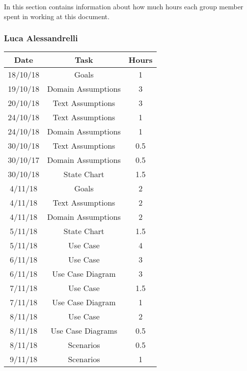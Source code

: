In this section contains information about how much hours each group member spent in working at this document.
\bigbreak

\subsubsection{Luca Alessandrelli}
\begin{table}[h]
\centering
\begin{tabular}{|c|c|c|}
\hline
\rowcolor[HTML]{FE996B} 
Date & Task & Hours 
\\ \hline
\rowcolor[HTML]{FFFC9E} 
18/10/18  & Goals & 1  
\\ \hline
\rowcolor[HTML]{FFFC9E} 
19/10/18 & Domain Assumptions & 3 
\\ \hline
\rowcolor[HTML]{FFFC9E}
20/10/18 & Text Assumptions & 3
\\ \hline
\rowcolor[HTML]{FFFC9E}
24/10/18 & Text Assumptions & 1
\\ \hline
\rowcolor[HTML]{FFFC9E}
24/10/18 & Domain Assumptions & 1
\\ \hline
\rowcolor[HTML]{FFFC9E}
30/10/18 & Text Assumptions & 0.5
\\ \hline
\rowcolor[HTML]{FFFC9E}
30/10/17 & Domain Assumptions & 0.5
\\ \hline
\rowcolor[HTML]{FFFC9E}
30/10/18 & State Chart & 1.5
\\ \hline
\rowcolor[HTML]{FFFC9E}
4/11/18 & Goals & 2
\\ \hline
\rowcolor[HTML]{FFFC9E}
4/11/18 & Text Assumptions & 2
\\ \hline
\rowcolor[HTML]{FFFC9E}
4/11/18 & Domain Assumptions & 2
\\ \hline
\rowcolor[HTML]{FFFC9E}
5/11/18 & State Chart & 1.5
\\ \hline
\rowcolor[HTML]{FFFC9E}
5/11/18 & Use Case & 4
\\ \hline
\rowcolor[HTML]{FFFC9E}
6/11/18 & Use Case & 3
\\ \hline
\rowcolor[HTML]{FFFC9E}
6/11/18 & Use Case Diagram & 3
\\ \hline
\rowcolor[HTML]{FFFC9E}
7/11/18 & Use Case & 1.5
\\ \hline
\rowcolor[HTML]{FFFC9E}
7/11/18 & Use Case Diagram & 1
\\ \hline
\rowcolor[HTML]{FFFC9E}
8/11/18 & Use Case & 2
\\ \hline
\rowcolor[HTML]{FFFC9E}
8/11/18 & Use Case Diagrams & 0.5
\\ \hline
\rowcolor[HTML]{FFFC9E}
8/11/18 & Scenarios & 0.5
\\ \hline
\rowcolor[HTML]{FFFC9E}
9/11/18 & Scenarios & 1
\\ \hline


\end{tabular}
\end{table}
